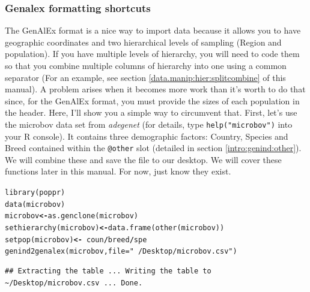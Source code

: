\documentclass[letterpaper]{article}\usepackage[]{graphicx}\usepackage[]{color}
\makeatletter
\newcommand{\hlstr}[1]{\textcolor[rgb]{0.651,0.522,0}{#1}}%
\newcommand{\hlopt}[1]{\textcolor[rgb]{1,0,0.502}{\textbf{#1}}}%
\newcommand{\hlstd}[1]{\textcolor[rgb]{0,0,0}{#1}}%
\newcommand{\hlkwb}[1]{\textcolor[rgb]{0.502,0.502,0.753}{\textbf{#1}}}%
\newcommand{\hlkwc}[1]{\textcolor[rgb]{0,0.502,0.753}{#1}}%
\newcommand{\hlkwd}[1]{\textcolor[rgb]{0,0.267,0.4}{#1}}%
\newenvironment{kframe}{%
 \def\at@end@of@kframe{}%
 \ifinner\ifhmode%
  \def\at@end@of@kframe{\end{minipage}}%
  \begin{minipage}{\columnwidth}%
 \fi\fi%
 \def\FrameCommand##1{\hskip\@totalleftmargin \hskip-\fboxsep
 \colorbox{shadecolor}{##1}\hskip-\fboxsep
     \hskip-\linewidth \hskip-\@totalleftmargin \hskip\columnwidth}%
 \MakeFramed {\advance\hsize-\width
   \@totalleftmargin\z@ \linewidth\hsize
   \@setminipage}}%
 {\par\unskip\endMakeFramed%
 \at@end@of@kframe}
\newenvironment{knitrout}{}{} %
\newcommand{\tab}{\hspace*{1em}}
\makeatother
\begin{document}
\subsubsection{Genalex formatting shortcuts}\label{intro:import:genalex.short}

\tab\tab The GenAlEx format is a nice way to import data because it allows you to have geographic coordinates and two hierarchical levels of sampling (Region and population). If you have multiple levels of hierarchy, you will need to code them so that you combine multiple columns of hierarchy into one using a common separator (For an example, see section \ref{data.manip:hier:splitcombine} of this manual). A problem arises when it becomes more work than it's worth to do that since, for the GenAlEx format, you must provide the sizes of each population in the header. Here, I'll show you a simple way to circumvent that. First, let's use the microbov data set from \textit{adegenet} (for details, type \texttt{help("microbov")} into your R console). It contains three demographic factors: Country, Species and Breed contained within the \texttt{@other} slot (detailed in section \ref{intro:genind:other}). We will combine these and save the file to our desktop. We will cover these functions later in this manual. For now, just know they exist.

\begin{knitrout}\footnotesize
{}\color{fgcolor}\begin{kframe}
\begin{alltt}
\hlkwd{library}\hlstd{(poppr)}
\hlkwd{data}\hlstd{(microbov)}
\hlstd{microbov} \hlkwb{<-} \hlkwd{as.genclone}\hlstd{(microbov)}
\hlkwd{sethierarchy}\hlstd{(microbov)} \hlkwb{<-} \hlkwd{data.frame}\hlstd{(}\hlkwd{other}\hlstd{(microbov))}
\hlkwd{setpop}\hlstd{(microbov)} \hlkwb{<-} \hlopt{~}\hlstd{coun}\hlopt{/}\hlstd{breed}\hlopt{/}\hlstd{spe}
\hlkwd{genind2genalex}\hlstd{(microbov,} \hlkwc{file} \hlstd{=} \hlstr{"~/Desktop/microbov.csv"}\hlstd{)}
\end{alltt}
\end{kframe}
\end{knitrout}

\begin{knitrout}\footnotesize
{}\color{fgcolor}\begin{kframe}
\begin{verbatim}
## Extracting the table ... Writing the table to ~/Desktop/microbov.csv ... Done.
\end{verbatim}
\end{kframe}
\end{knitrout}
\end{document}
